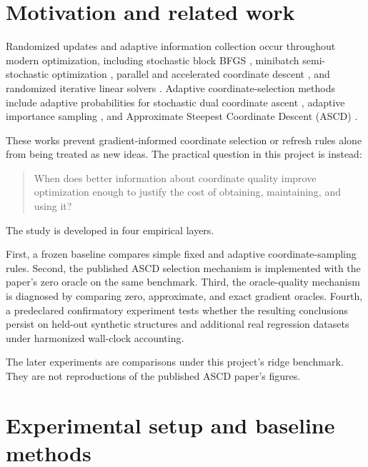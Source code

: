 \documentclass[11pt]{article}
\begin{document}
\section{Motivation and related work}

Randomized updates and adaptive information collection occur throughout
modern optimization, including stochastic block BFGS
\cite{gower2016}, minibatch semi-stochastic optimization
\cite{konecny2016}, parallel and accelerated coordinate descent
\cite{richtarik2016,fercoq2015}, and randomized iterative linear
solvers \cite{gower2015}. Adaptive coordinate-selection methods include
adaptive probabilities for stochastic dual coordinate ascent
\cite{csiba2015}, adaptive importance sampling
\cite{perekrestenko2017}, and Approximate Steepest Coordinate Descent
(ASCD) \cite{stich2017}.

These works prevent gradient-informed coordinate selection or refresh
rules alone from being treated as new ideas. The practical question in
this project is instead:

\begin{quote}
When does better information about coordinate quality improve
optimization enough to justify the cost of obtaining, maintaining,
and using it?
\end{quote}

The study is developed in four empirical layers.

First, a frozen baseline compares simple fixed and adaptive
coordinate-sampling rules. Second, the published ASCD selection
mechanism is implemented with the paper's zero oracle on the same
benchmark. Third, the oracle-quality mechanism is diagnosed by comparing
zero, approximate, and exact gradient oracles. Fourth, a predeclared
confirmatory experiment tests whether the resulting conclusions persist
on held-out synthetic structures and additional real regression
datasets under harmonized wall-clock accounting.

The later experiments are comparisons under this project's ridge
benchmark. They are not reproductions of the published ASCD paper's
figures.


\section{Experimental setup and baseline methods}
\end{document}
